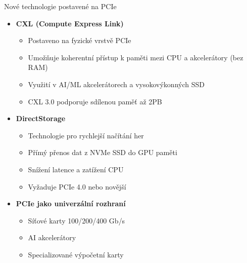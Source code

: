 \documentclass[aspectratio=43]{beamer}
\begin{document}
\begin{frame}{Nové technologie postavené na PCIe}
    \begin{itemize}
        \item \textbf{CXL (Compute Express Link)}
            \begin{itemize}
                \item Postaveno na fyzické vrstvě PCIe
                \item Umožňuje koherentní přístup k paměti mezi CPU a akcelerátory (bez RAM)
                \item Využití v AI/ML akcelerátorech a vysokovýkonných SSD
                \item CXL 3.0 podporuje sdílenou paměť až 2PB
            \end{itemize}
        \item \textbf{DirectStorage}
            \begin{itemize}
                \item Technologie pro rychlejší načítání her
                \item Přímý přenos dat z NVMe SSD do GPU paměti
                \item Snížení latence a zatížení CPU
                \item Vyžaduje PCIe 4.0 nebo novější
            \end{itemize}
        \item \textbf{PCIe jako univerzální rozhraní}
            \begin{itemize}
                \item Síťové karty 100/200/400 Gb/s
                \item AI akcelerátory
                \item Specializované výpočetní karty
            \end{itemize}
    \end{itemize}
\end{frame}
\end{document}
